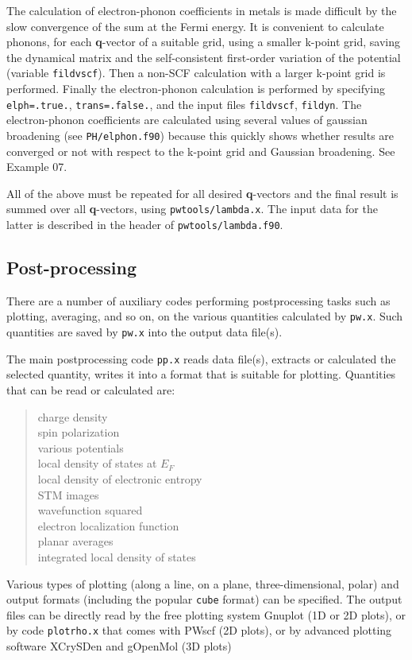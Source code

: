 \documentclass[12pt,a4paper]{article}
\begin{document}
The calculation of electron-phonon coefficients in metals is made
difficult by the slow convergence of the sum at the Fermi energy.
It is convenient to calculate phonons, for each \textbf{q}-vector of a
suitable grid, using a smaller k-point grid, saving the dynamical
matrix and the self-consistent first-order variation of the potential
(variable \texttt{fildvscf}).
Then a non-SCF calculation with a larger k-point grid is performed.
Finally the electron-phonon calculation is performed by specifying
\texttt{elph=.true.}, \texttt{trans=.false.}, and the input files
\texttt{fildvscf}, \texttt{fildyn}.
The electron-phonon coefficients are calculated using several values
of gaussian broadening (see \texttt{PH/elphon.f90}) because this
quickly shows whether results are converged or not with respect to the
k-point grid and Gaussian broadening. See Example 07.

All of the above must be repeated for all desired \textbf{q}-vectors
and the final result is summed over all \textbf{q}-vectors, using
\texttt{pwtools/lambda.x}. The input data for the latter is
described in the header of \texttt{pwtools/lambda.f90}.

\subsection{Post-processing}

There are a number of auxiliary codes performing postprocessing tasks
such as plotting, averaging, and so on, on the various quantities
calculated by \texttt{pw.x}.
Such quantities are saved by \texttt{pw.x} into the output data
file(s).

The main postprocessing code \texttt{pp.x} reads data file(s),
extracts or calculated the selected quantity, writes it into
a format that is suitable for plotting. Quantities that can
be read or calculated are:

\begin{quote}
  charge density\\
  spin polarization\\
  various potentials\\
  local density of states at $E_F$\\
  local density of electronic entropy\\
  STM images\\
  wavefunction squared\\
  electron localization function\\
  planar averages\\
  integrated local density of states
\end{quote}
Various types of plotting (along a line, on a plane, three-dimensional,
polar) and output formats (including the popular {\tt cube} format) can
be specified. The output files can be directly read by the free plotting
system Gnuplot (1D or 2D plots), 
or by code \texttt{plotrho.x} that comes with PWscf (2D plots), or 
by advanced plotting software XCrySDen and gOpenMol (3D plots)
\end{document}
